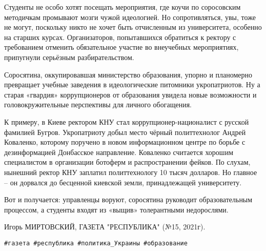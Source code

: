 Студенты не особо хотят посещать мероприятия, где коучи по соросовским
методичкам промывают мозги чужой идеологией. Но сопротивляться, увы, тоже не
могут, поскольку никто не хочет быть отчисленным из университета, особенно на
старших курсах. Организаторов, попытавшихся обратиться к ректору с требованием
отменить обязательное участие во внеучебных мероприятиях, припугнули серьёзным
разбирательством. 

Соросятина, оккупировавшая министерство образования, упорно и планомерно
превращает учебные заведения в идеологические питомники укропатриотов. Ну а
старая «гвардия» коррупционеров от образования увидела новые возможности и
головокружительные перспективы для личного обогащения. 

К примеру, в Киеве ректором КНУ стал коррупционер-националист с русской
фамилией Бугров. Укропатриоту добыл место чёрный политтехнолог Андрей
Коваленко, которому поручено в новом информационном центре по борьбе с
дезинформацией Донбасское направление. Коваленко считается хорошим специалистом
в организации ботоферм и распространении фейков. По слухам, нынешний ректор КНУ
заплатил политтехнологу 10 тысяч долларов. Но главное – он дорвался до
бесценной киевской земли, принадлежащей университету. 

Вот и получается: управленцы воруют, соросятина руководит образовательным
процессом, а студенты входят из «выщив» толерантными недорослями. 

Игорь МИРТОВСКИЙ, ГАЗЕТА "РЕСПУБЛИКА" (№15, 2021г).

\verb|#газета #республика #политика_Украины #образование|
